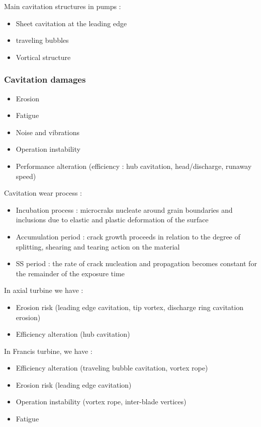 \documentclass[../main.tex]{subfiles}
\begin{document}
Main cavitation structures in pumps : \begin{itemize}
    \item Sheet cavitation at the leading edge
    \item traveling bubbles
    \item Vortical structure
\end{itemize}

\subsubsection{Cavitation damages}
\begin{itemize}
    \item Erosion 
    \item Fatigue
    \item Noise and vibrations
    \item Operation instability
    \item Performance alteration (efficiency : hub cavitation, head/discharge, runaway speed)
\end{itemize}

Cavitation wear process : \begin{itemize}
    \item Incubation process : microcraks nucleate around grain boundaries and inclusions due to elastic and plastic deformation of the surface
    \item Accumulation period : crack growth proceeds in relation to the degree of splitting, shearing and tearing action on the material
    \item SS period : the rate of crack nucleation and propagation becomes constant for the remainder of the exposure time
\end{itemize}


In axial turbine we have : \begin{itemize}
    \item Erosion risk (leading edge cavitation, tip vortex, discharge ring cavitation erosion)
    \item Efficiency alteration (hub cavitation)
\end{itemize}

In Francis turbine, we have : \begin{itemize}
    \item Efficiency alteration (traveling bubble cavitation, vortex rope)
    \item Erosion risk (leading edge cavitation)
    \item Operation instability (vortex rope, inter-blade vertices)
    \item Fatigue
\end{itemize}
\end{document}
